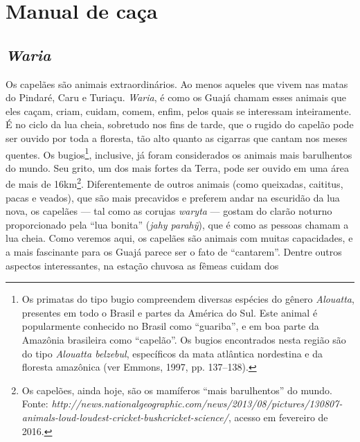 \chapter{Manual de caça}


\section{\emph{Waria}}

Os capelães são animais extraordinários. Ao menos aqueles que vivem nas
matas do Pindaré, Caru e Turiaçu. \emph{Waria}, é como os Guajá chamam
esses animais que eles caçam, criam, cuidam, comem, enfim, pelos quais
se interessam inteiramente. É no ciclo da lua cheia, sobretudo nos fins
de tarde, que o rugido do capelão pode ser ouvido por toda a floresta,
tão alto quanto as cigarras que cantam nos meses quentes. Os
bugios\footnote{Os primatas do tipo bugio compreendem diversas espécies
  do gênero \emph{Alouatta}, presentes em todo o Brasil e partes da
  América do Sul. Este animal é popularmente conhecido no Brasil como
  ``guariba'', e em boa parte da Amazônia brasileira como ``capelão''.
  Os bugios encontrados nesta região são do tipo \emph{Alouatta
  belzebul}, específicos da mata atlântica nordestina e da floresta
  amazônica (ver Emmons, 1997, pp. 137--138).}, inclusive, já foram
considerados os animais mais barulhentos do mundo. Seu grito, um dos
mais fortes da Terra, pode ser ouvido em uma área de mais de
16km\footnote{Os capelões, ainda hoje, são os mamíferos ``mais
  barulhentos'' do mundo. Fonte:
  \emph{http://news.nationalgeographic.com/news/2013/08/pictures/130807-animals-loud-loudest-cricket-bushcricket-science/},
  acesso em fevereiro de 2016.}. Diferentemente de outros animais (como
queixadas, caititus, pacas e veados), que são mais precavidos e preferem
andar na escuridão da lua nova, os capelães --- tal como as corujas
\emph{waryta} --- gostam do clarão noturno proporcionado pela ``lua
bonita'' (\emph{jahy parahỹ}), que é como as pessoas chamam a lua cheia.
Como veremos aqui, os capelães são animais com muitas capacidades, e a
mais fascinante para os Guajá parece ser o fato de ``cantarem''. Dentre
outros aspectos interessantes, na estação chuvosa as fêmeas cuidam dos
